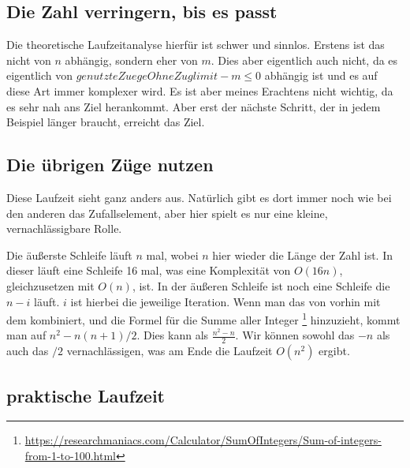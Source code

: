 \documentclass[a4paper,10pt,ngerman]{scrartcl}
\begin{document}
\subsection{Die Zahl verringern, bis es passt}

Die theoretische Laufzeitanalyse hierfür ist schwer und sinnlos. Erstens ist das nicht von $n$ abhängig, sondern eher von $m$. Dies aber eigentlich auch nicht, da es eigentlich von $genutzteZuegeOhneZuglimit - m \leq 0$ abhängig ist und es auf diese Art immer komplexer wird. Es ist aber meines Erachtens nicht wichtig, da es sehr nah ans Ziel herankommt. Aber erst der nächste Schritt, der in jedem Beispiel länger braucht, erreicht das Ziel.

\subsection{Die übrigen Züge nutzen}

Diese Laufzeit sieht ganz anders aus. Natürlich gibt es dort immer noch wie bei den anderen das Zufallselement, aber hier spielt es nur eine kleine, vernachlässigbare Rolle.

Die äußerste Schleife läuft $n$ mal, wobei $n$ hier wieder die Länge der Zahl ist. In dieser läuft eine Schleife 16 mal, was eine Komplexität von $O(16n)$, gleichzusetzen mit $O(n)$, ist. In der äußeren Schleife ist noch eine Schleife die $n-i$ läuft. $i$ ist hierbei die jeweilige Iteration. 
Wenn man das von vorhin mit dem kombiniert, und die Formel für die Summe aller Integer \footnote{\url{https://researchmaniacs.com/Calculator/SumOfIntegers/Sum-of-integers-from-1-to-100.html}} hinzuzieht, kommt man auf $n^2 - n(n+1)/2$. Dies kann als $\frac{n^2 - n}{2}$. Wir können sowohl das $-n$ als auch das $/2$ vernachlässigen, was am Ende die Laufzeit $O(n^2)$ ergibt.

\subsection{praktische Laufzeit}
\end{document}
